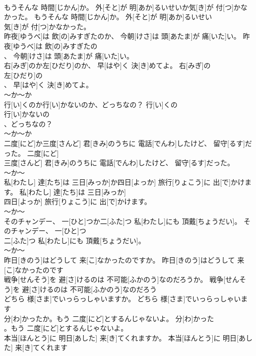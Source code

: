 \documentclass[8pt]{extreport}
\begin{document}
\begin{CJK}{UTF8}{min}
\\	もうそんな 時間[じかん]か。 外[そと]が 明[あか]るいせいか気[き]が 付[つ]かなかった。	もうそんな 時間[じかん]か。 外[そと]が 明[あか]るいせい
\\	気[き]が 付[つ]かなかった。	
\\	昨夜[ゆうべ]は 飲[の]みすぎたのか、 今朝[けさ]は 頭[あたま]が 痛[いた]い。	昨夜[ゆうべ]は 飲[の]みすぎたの
\\	、 今朝[けさ]は 頭[あたま]が 痛[いた]い。	
\\	右[みぎ]のか左[ひだり]のか、 早[はや]く 決[き]めてよ。	右[みぎ]の
\\	左[ひだり]の
\\	、 早[はや]く 決[き]めてよ。	
\\	～か～か 
\\	行[い]くのか行[い]かないのか、どっちなの？	行[い]くの
\\	行[い]かないの
\\	、どっちなの？	
\\	～か～か 
\\	二度[にど]か三度[さんど] 君[きみ]のうちに 電話[でんわ]したけど、 留守[るす]だった。	二度[にど]
\\	三度[さんど] 君[きみ]のうちに 電話[でんわ]したけど、 留守[るす]だった。	
\\	～か～
\\	私[わたし] 達[たち]は 三日[みっか]か四日[よっか] 旅行[りょこう]に 出[で]かけます。	私[わたし] 達[たち]は 三日[みっか]
\\	四日[よっか] 旅行[りょこう]に 出[で]かけます。	
\\	～か～
\\	そのチャンデー、 一[ひと]つか二[ふた]つ 私[わたし]にも 頂戴[ちょうだい]。	そのチャンデー、 一[ひと]つ
\\	二[ふた]つ 私[わたし]にも 頂戴[ちょうだい]。	
\\	～か～
\\	昨日[きのう]はどうして 来[こ]なかったのですか。	昨日[きのう]はどうして 来[こ]なかったのです
\\	戦争[せんそう]を 避[さ]けるのは 不可能[ふかのう]なのだろうか。	戦争[せんそう]を 避[さ]けるのは 不可能[ふかのう]なのだろう
\\	どちら 様[さま]でいっらっしゃいますか。	どちら 様[さま]でいっらっしゃいます
\\	分[わ]かったか。もう 二度[にど]とするんじゃないよ。	分[わ]かった
\\	。もう 二度[にど]とするんじゃないよ。	
\\	本当[ほんとう]に 明日[あした] 来[き]てくれますか。	本当[ほんとう]に 明日[あした] 来[き]てくれます

\end{CJK}
\end{document}
